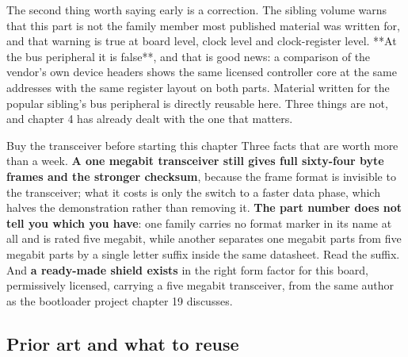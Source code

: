 The second thing worth saying early is a correction. The sibling volume warns
that this part is not the family member most published material was written
for, and that warning is true at board level, clock level and clock-register
level. **At the bus peripheral it is false**, and that is good news: a
comparison of the vendor's own device headers shows the same licensed controller
core at the same addresses with the same register layout on both parts.
Material written for the popular sibling's bus peripheral is directly reusable
here. Three things are not, and chapter 4 has already dealt with the one that
matters.

\begin{note}{Buy the transceiver before starting this chapter}
Three facts that are worth more than a week. \textbf{A one megabit transceiver
still gives full sixty-four byte frames and the stronger checksum}, because the
frame format is invisible to the transceiver; what it costs is only the switch
to a faster data phase, which halves the demonstration rather than removing it.
\textbf{The part number does not tell you which you have}: one family carries no
format marker in its name at all and is rated five megabit, while another
separates one megabit parts from five megabit parts by a single letter suffix
inside the same datasheet. Read the suffix. And \textbf{a ready-made shield
exists} in the right form factor for this board, permissively licensed, carrying
a five megabit transceiver, from the same author as the bootloader project
chapter 19 discusses.
\end{note}

\subsection*{Prior art and what to reuse}

